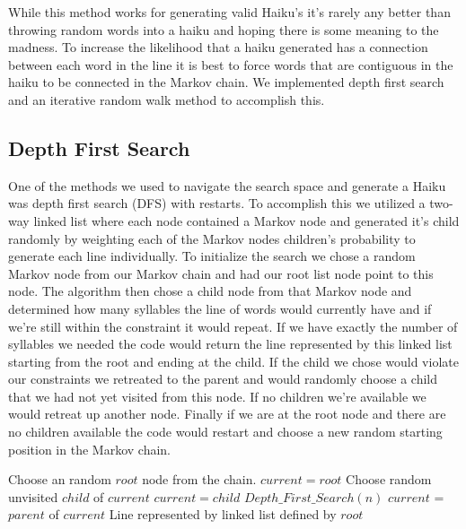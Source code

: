 \documentclass[]{article}
\begin{document}
While this method works for generating valid Haiku's it's rarely any better than throwing random words into a haiku and hoping there is some meaning to the madness. To increase the likelihood that a haiku generated has a connection between each word in the line it is best to force words that are contiguous in the haiku to be connected in the Markov chain. We implemented depth first search and an iterative random walk method to accomplish this.

\subsection{Depth First Search}
One of the methods we used to navigate the search space and generate a Haiku was depth first search (DFS) with restarts. To accomplish this we utilized a two-way linked list where each node contained a Markov node and generated it's child randomly by weighting each of the Markov nodes children's probability to generate each line individually. To initialize the search we chose a random Markov node from our Markov chain and had our root list node point to this node. The algorithm then chose a child node from that Markov node and determined how many syllables the line of words would currently have and if we're still within the constraint it would repeat. If we have exactly the number of syllables we needed the code would return the line represented by this linked list starting from the root and ending at the child. If the child we chose would violate our constraints we retreated to the parent and would randomly choose a child that we had not yet visited from this node. If no children we're available we would retreat up another node. Finally if we are at the root node and there are no children available the code would restart and choose a new random starting position in the Markov chain.

\begin{algorithm}[H]
	\caption{$Depth\_First\_Search(n)$} \label{DFSB}
	\begin{algorithmic}[1]
		\State Choose an random $root$ node from the chain.
		\State $current = root$
				\State Choose random unvisited $child$ of $current$
					\State $current = child$
				\EndIf
			\Else
					\Return $Depth\_First\_Search(n)$
				\Else
					\State $current$ = $parent$ of $current$
				\EndIf
			\EndIf
		\EndWhile
		\Return Line represented by linked list defined by $root$
	\end{algorithmic}
\end{algorithm}
\end{document}
